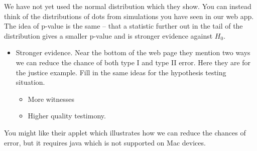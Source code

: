    We have not yet used the normal distribution which they show.  You
   can instead think of the distributions of dots from simulations you
   have seen in our web app. The idea of p-value is the same --
   that a statistic further out in the tail of the distribution gives
   a smaller p-value and is stronger evidence against $H_0$.

   \begin{itemize}
   \item Stronger evidence. Near the bottom of the web page they
     mention two ways we can reduce the chance of both type I and type
     II error. Here they are for the justice example.  Fill in the
     same ideas for the hypothesis testing situation.  
     \begin{itemize}
     \item More witnesses \vspace{1in}
     \item Higher quality testimony. \vspace{1in}
     \end{itemize}
   \end{itemize}
 
 You might like their applet which illustrates how we can reduce the
 chances of error, but it requires java which is not supported on Mac
 devices. 